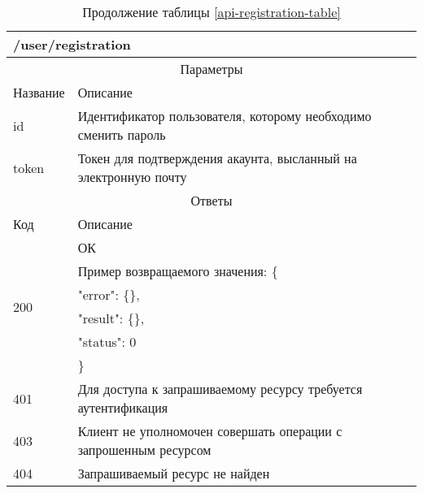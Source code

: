 \begin{table}[H]
  \caption*{Продолжение таблицы \ref{api-registration-table}}
  \begin{tabular}{|p{6cm}|p{10cm}|}
  \hline \multicolumn{2}{|l|}{/user/registration} \\
  \hline \multicolumn{2}{|c|}{Параметры} \\
  \hline Название & Описание \\
  \hline id & Идентификатор пользователя, которому необходимо сменить пароль \\
  \hline token & Токен для подтверждения акаунта, высланный на электронную почту \\
  \hline \multicolumn{2}{|c|}{Ответы} \\
  \hline Код & Описание \\
  \hline \multirow{6}{=}{200} & ОК \\
   & Пример возвращаемого значения: \{ \\
   & "error": \{\}, \\
   & "result": \{\}, \\
   & "status": 0 \\
   & \} \\
  \hline 401 & Для доступа к запрашиваемому ресурсу требуется аутентификация \\
  \hline 403 & Клиент не уполномочен совершать операции с запрошенным ресурсом \\
  \hline 404 & Запрашиваемый ресурс не найден \\
  \end{tabular}
\end{table}
